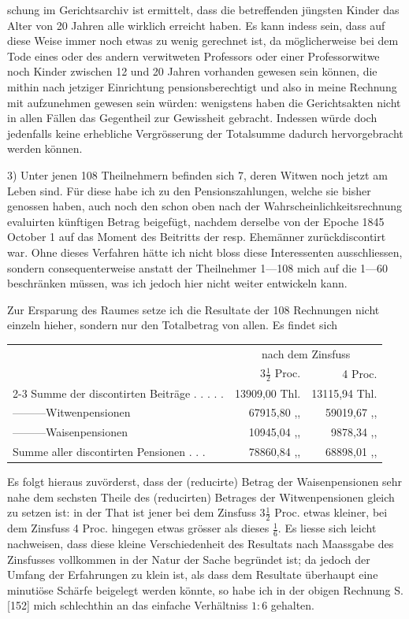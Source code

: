 schung im Gerichtsarchiv ist ermittelt, dass die betreffenden jüngsten Kinder das Alter von 20 Jahren alle wirklich erreicht haben. Es kann indess sein, dass auf diese Weise immer noch etwas zu wenig gerechnet ist, da möglicherweise bei dem Tode eines oder des andern verwitweten Professors oder einer Professorwitwe noch Kinder zwischen 12 und 20 Jahren vorhanden gewesen sein können, die mithin nach jetziger Einrichtung pensionsberechtigt und also in meine Rechnung mit aufzunehmen gewesen sein würden: wenigstens haben die Gerichtsakten nicht in allen Fällen das Gegentheil zur Gewissheit gebracht. Indessen würde doch jedenfalls keine erhebliche Vergrösserung der Totalsumme dadurch hervorgebracht werden können.

3) Unter jenen 108 Theilnehmern befinden sich 7, deren Witwen noch jetzt am Leben sind. Für diese habe ich zu den Pensionszahlungen, welche sie bisher genossen haben, auch noch den schon oben nach der Wahrscheinlichkeitsrechnung evaluirten künftigen Betrag beigefügt, nachdem derselbe von der Epoche 1845 October 1 auf das Moment des Beitritts der resp. Ehemänner zurückdiscontirt war. Ohne dieses Verfahren hätte ich nicht bloss diese Interessenten ausschliessen, sondern consequenterweise anstatt der Theilnehmer 1—108 mich auf die 1—60 beschränken müssen, was ich jedoch hier nicht weiter entwickeln kann.

Zur Ersparung des Raumes setze ich die Resultate der 108 Rechnungen nicht einzeln hieher, sondern nur den Totalbetrag von allen. Es findet sich
\begin{center}
\footnotesize\setlength{\tabcolsep}{3pt}
\begin{tabular}{l r|r}
&\multicolumn{2}{c}{nach dem Zinsfuss}\\
&\(3\tfrac{1}{2}\) Proc.&4 Proc.\\\cline{2-3}
Summe der discontirten Beiträge . . . . .&13909,00 Thl.&13115,94 Thl.\\
—\quad —\quad —\quad Witwenpensionen&67915,80 ,, &59019,67 ,, \\
—\quad —\quad —\quad Waisenpensionen&10945,04 ,, &9878,34 ,, \\
Summe aller discontirten Pensionen . . .&78860,84 ,, &68898,01 ,,
\end{tabular}
\end{center}
\noindent\hspace*{\parindent}Es folgt hieraus zuvörderst, dass der (reducirte) Betrag der Waisenpensionen sehr nahe dem sechsten Theile des (reducirten) Betrages der Witwenpensionen gleich zu setzen ist: in der That ist jener bei dem Zinsfuss \(3\tfrac{1}{2}\) Proc. etwas kleiner, bei dem Zinsfuss 4 Proc. hingegen etwas grösser als dieses \(\tfrac{1}{6}\). Es liesse sich leicht nachweisen, dass diese kleine Verschiedenheit des Resultats nach Maassgabe des Zinsfusses vollkommen in der Natur der Sache begründet ist; da jedoch der Umfang der Erfahrungen zu klein ist, als dass dem Resultate überhaupt eine minutiöse Schärfe beigelegt werden könnte, so habe ich in der obigen Rechnung S. [152] mich schlechthin an das einfache Verhältniss \(1:6\) gehalten.


